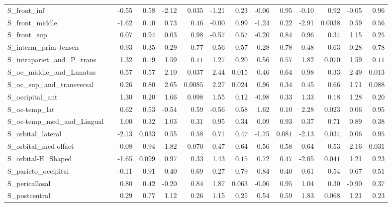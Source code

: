 {\begin{longtable}{llrrrrrrrrrrrr}
S\_front\_inf &  & -0.55 & $0.58$ & -2.12 & $0.035$ & -1.21 & $0.23$ & -0.06 & $0.95$ & -0.10 & $0.92$ & -0.05 & $0.96$ \\
S\_front\_middle &  & -1.62 & $0.10$ & 0.73 & $0.46$ & -0.00 & $0.99$ & -1.24 & $0.22$ & -2.91 & $0.0038$ & 0.59 & $0.56$ \\
S\_front\_sup &  & 0.07 & $0.94$ & 0.03 & $0.98$ & -0.57 & $0.57$ & -0.20 & $0.84$ & 0.96 & $0.34$ & 1.15 & $0.25$ \\
S\_interm\_prim-Jensen &  & -0.93 & $0.35$ & 0.29 & $0.77$ & -0.56 & $0.57$ & -0.28 & $0.78$ & 0.48 & $0.63$ & -0.28 & $0.78$ \\
S\_intrapariet\_and\_P\_trans &  & 1.32 & $0.19$ & 1.59 & $0.11$ & 1.27 & $0.20$ & 0.56 & $0.57$ & 1.82 & $0.070$ & 1.59 & $0.11$ \\
S\_oc\_middle\_and\_Lunatus &  & 0.57 & $0.57$ & 2.10 & $0.037$ & 2.44 & $0.015$ & 0.46 & $0.64$ & 0.98 & $0.33$ & 2.49 & $0.013$ \\
S\_oc\_sup\_and\_transversal &  & 0.26 & $0.80$ & 2.65 & $0.0085$ & 2.27 & $0.024$ & 0.96 & $0.34$ & 0.45 & $0.66$ & 1.71 & $0.088$ \\
S\_occipital\_ant &  & 1.30 & $0.20$ & 1.66 & $0.098$ & 1.55 & $0.12$ & -0.98 & $0.33$ & 1.33 & $0.18$ & 1.28 & $0.20$ \\
S\_oc-temp\_lat &  & 0.62 & $0.53$ & -0.54 & $0.59$ & -0.56 & $0.58$ & 1.62 & $0.10$ & 2.28 & $0.023$ & 0.06 & $0.95$ \\
S\_oc-temp\_med\_and\_Lingual &  & 1.00 & $0.32$ & 1.03 & $0.31$ & 0.95 & $0.34$ & 0.09 & $0.93$ & 0.37 & $0.71$ & 0.89 & $0.38$ \\
S\_orbital\_lateral &  & -2.13 & $0.033$ & 0.55 & $0.58$ & 0.71 & $0.47$ & -1.75 & $0.081$ & -2.13 & $0.034$ & 0.06 & $0.95$ \\
S\_orbital\_med-olfact &  & -0.08 & $0.94$ & -1.82 & $0.070$ & -0.47 & $0.64$ & -0.56 & $0.58$ & 0.64 & $0.53$ & -2.16 & $0.031$ \\
S\_orbital-H\_Shaped &  & -1.65 & $0.099$ & 0.97 & $0.33$ & 1.43 & $0.15$ & 0.72 & $0.47$ & -2.05 & $0.041$ & 1.21 & $0.23$ \\
S\_parieto\_occipital &  & -0.11 & $0.91$ & 0.40 & $0.69$ & 0.27 & $0.79$ & 0.84 & $0.40$ & 0.61 & $0.54$ & 0.67 & $0.51$ \\
S\_pericallosal &  & 0.80 & $0.42$ & -0.20 & $0.84$ & 1.87 & $0.063$ & -0.06 & $0.95$ & 1.04 & $0.30$ & -0.90 & $0.37$ \\
S\_postcentral &  & 0.29 & $0.77$ & 1.12 & $0.26$ & 1.15 & $0.25$ & 0.54 & $0.59$ & 1.83 & $0.068$ & 1.21 & $0.23$ \\

\end{longtable}}
